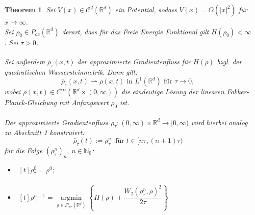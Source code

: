 \documentclass[11pt,a4paper,notitlepage]{scrreprt}
\newcommand{\RR}{\mathbb{R}}
\newcommand{\NN}{\mathbb{N}}
\newtheorem{theorem}[defi]{Theorem}
\begin{document}
\begin{theorem}
Sei $V(x)\in \mathcal{C}^2(\RR^d)$ ein Potential, sodass $V(x)=O(\vert x \vert^2)$ für $x\to\infty$. \\
Sei $\rho_0\in P_{ac}(\RR^d)$ derart, dass für das Freie Energie Funktional gilt $H(\rho_0)<\infty$. Sei $\tau>0$.\\\\
Sei außerdem $\bar{\rho}_\tau(x,t)$ der approximierte Gradientenfluss für $H(\rho)$ bzgl. der quadratischen Wassersteinmetrik. 
Dann gilt: \\
\begin{equation*}
\bar{\rho}_\tau(x,t)\rightharpoonup \rho(x,t) \text{ in } L^1(\RR^d) \text{ für } \tau\to 0,
\end{equation*}
wobei $\rho(x,t)\in C^\infty(\RR^d\times(0,\infty))$ die eindeutige Lösung der linearen Fokker-Planck-Gleichung mit Anfangswert $\rho_0$ ist. \\\\
Der approximierte Gradientenfluss $\bar{\rho}_\tau:(0,\infty)\times\RR^d\to[0,\infty)$ wird hierbei analog zu Abschnitt 1 konstruiert:
\begin{equation*}
\bar{\rho}_\tau(t):=\rho_\tau^n ~\text{ für }t\in[n\tau,(n+1)\tau)
\end{equation*}
für die Folge $(\rho_\tau^n)_n,~n\in\NN_0$:
\begin{itemize}
\item[i)]$\begin{aligned}[t]\rho_\tau^0=\rho^0; \end{aligned}$
\item[ii)]$\begin{aligned}[t]
\rho_\tau^{n+1}=\underset{\rho\in\mathcal{P}_{ac}(\RR^d)}{\operatorname{argmin}}\left\{H(\rho)+\dfrac{W_2(\rho_\tau^n,\rho)^2}{2\tau}\right\}
\end{aligned}$\end{itemize}
\end{theorem}
\end{document}
